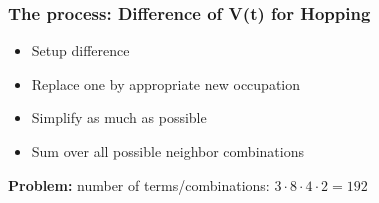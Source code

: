     \begin{frame}
        \frametitle{The process: Difference of V(t) for Hopping}
        
        \hspace{-1cm}

        \vspace{0.3cm}

        \begin{itemize}
            \item Setup difference
            \item Replace one by appropriate new occupation
            \item Simplify as much as possible
            \item Sum over all possible neighbor combinations
        \end{itemize}

        \vspace{0.1cm}
        
        \textbf{Problem:} number of terms/combinations: $3 \cdot 8 \cdot 4 \cdot 2 = 192$


\end{frame}
